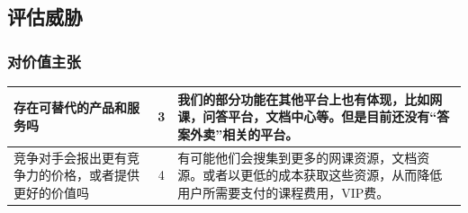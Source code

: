 \documentclass[a4paper]{ctexart}
\begin{document}






\FloatBarrier
\subsection{评估威胁}
\subsubsection{对价值主张}
\begin{table}[h]
  \centering
\begin{tabular}{|p{3.5cm}|c|p{10cm}|}
  \hline
  存在可替代的产品和服务吗 & 3 & 我们的部分功能在其他平台上也有体现，比如网课，问答平台，文档中心等。但是目前还没有“答案外卖”相关的平台。\\
  \hline
  竞争对手会报出更有竞争力的价格，或者提供更好的价值吗 & 4 & 有可能他们会搜集到更多的网课资源，文档资源。或者以更低的成本获取这些资源，从而降低用户所需要支付的课程费用，VIP费。\\
  \hline
\end{tabular}
\end{table}

\end{document}
